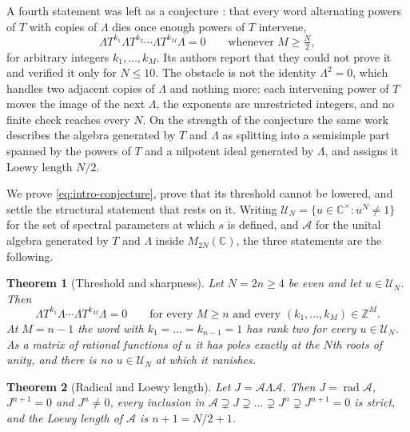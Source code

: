 \documentclass[11pt,reqno]{amsart}
\theoremstyle{plain}
\newtheorem{theorem}{Theorem}[section]
\theoremstyle{definition}
\theoremstyle{remark}
\numberwithin{equation}{section}
\begin{document}
A fourth statement was left as a conjecture \cite{Qiu_2026ky}: that every word
alternating powers of $T$ with copies of $\Lambda$ dies once enough powers of
$T$ intervene,
\begin{equation}
  \Lambda T^{k_{1}}\Lambda T^{k_{2}}\cdots\Lambda T^{k_{M}}\Lambda=0
  \qquad\text{whenever } M\ge \tfrac{N}{2},
  \label{eq:intro-conjecture}
\end{equation}
for arbitrary integers $k_{1},\dots,k_{M}$. Its authors report that they could
not prove it and verified it only for $N\le10$. The obstacle is not the
identity $\Lambda^{2}=0$, which handles two adjacent copies of $\Lambda$ and
nothing more: each intervening power of $T$ moves the image of the next
$\Lambda$, the exponents are unrestricted integers, and no finite check
reaches every $N$. On the strength of the conjecture the same work describes
the algebra generated by $T$ and $\Lambda$ as splitting into a semisimple part
spanned by the powers of $T$ and a nilpotent ideal generated by $\Lambda$, and
assigns it Loewy length $N/2$.

We prove \cref{eq:intro-conjecture}, prove that its threshold cannot be
lowered, and settle the structural statement that rests on it. Writing
$\mathcal{U}_{N}=\{u\in\mathbb{C}^{\times}:u^{N}\ne1\}$ for the set of
spectral parameters at which $s$ is defined, and $\mathcal{A}$ for the unital
algebra generated by $T$ and $\Lambda$ inside $M_{2N}(\mathbb{C})$, the three
statements are the following.

\begin{theorem}[Threshold and sharpness]
\label{thm:intro-main}
Let $N=2n\ge4$ be even and let $u\in\mathcal{U}_{N}$. Then
\begin{equation*}
  \Lambda T^{k_{1}}\Lambda\cdots\Lambda T^{k_{M}}\Lambda=0
  \qquad\text{for every } M\ge n \text{ and every }
  (k_{1},\dots,k_{M})\in\mathbb{Z}^{M}.
\end{equation*}
At $M=n-1$ the word with $k_{1}=\dots=k_{n-1}=1$ has rank two for every
$u\in\mathcal{U}_{N}$. As a matrix of rational functions of $u$ it has poles
exactly at the $N$th roots of unity, and there is no $u\in\mathcal{U}_{N}$ at
which it vanishes.
\end{theorem}

\begin{theorem}[Radical and Loewy length]
\label{thm:intro-radical}
Let $J=\mathcal{A}\Lambda\mathcal{A}$. Then $J=\operatorname{rad}\mathcal{A}$,
$J^{n+1}=0$ and $J^{n}\ne0$, every inclusion in
$\mathcal{A}\supsetneq J\supsetneq\dots\supsetneq J^{n}\supsetneq J^{n+1}=0$
is strict, and the Loewy length of $\mathcal{A}$ is $n+1=N/2+1$.
\end{theorem}
\end{document}
